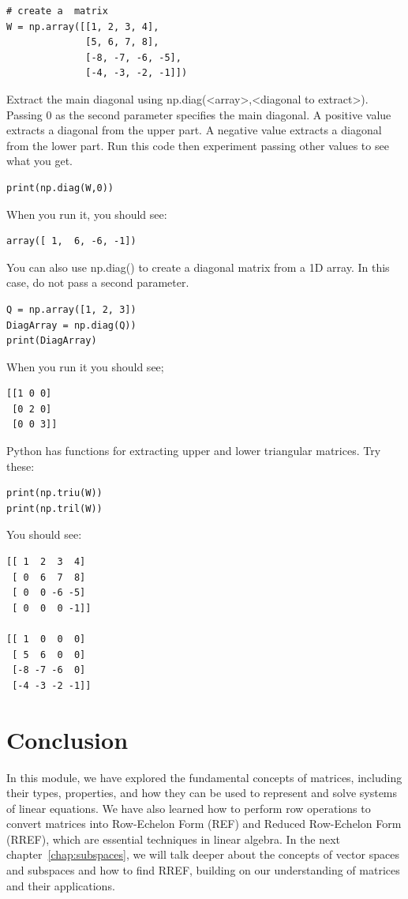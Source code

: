 \begin{verbatim}
# create a  matrix 
W = np.array([[1, 2, 3, 4], 
              [5, 6, 7, 8], 
              [-8, -7, -6, -5],
              [-4, -3, -2, -1]])
\end{verbatim}
Extract the main diagonal using np.diag(<array>,<diagonal to extract>). 
Passing 0 as the second parameter specifies the main diagonal. A positive value extracts a diagonal from the upper part. A negative value extracts a diagonal from the lower part. Run this code then experiment passing other values to see what you get.
\begin{verbatim}
print(np.diag(W,0))
\end{verbatim}
When you run it, you should see:
\begin{verbatim}
array([ 1,  6, -6, -1])
\end{verbatim}
You can also use np.diag() to create a diagonal matrix from a 1D array. In this case, do not pass a second parameter.
\begin{verbatim}
Q = np.array([1, 2, 3])
DiagArray = np.diag(Q))
print(DiagArray)
\end{verbatim}
When you run it you should see;
\begin{verbatim}
[[1 0 0]
 [0 2 0]
 [0 0 3]]
\end{verbatim}
Python has functions for extracting upper and lower triangular matrices. Try these:
\begin{verbatim}
print(np.triu(W))
print(np.tril(W))
\end{verbatim}
You should see:
\begin{verbatim}
[[ 1  2  3  4]
 [ 0  6  7  8]
 [ 0  0 -6 -5]
 [ 0  0  0 -1]]
 
[[ 1  0  0  0]
 [ 5  6  0  0]
 [-8 -7 -6  0]
 [-4 -3 -2 -1]]
\end{verbatim}

\section{Conclusion}
In this module, we have explored the fundamental concepts of matrices, including their types, properties, and how they can be used to represent and solve systems of linear equations. We have also learned how to perform row operations to convert matrices into Row-Echelon Form (REF) and Reduced Row-Echelon Form (RREF), which are essential techniques in linear algebra. In the next chapter~\ref{chap:subspaces}, we will talk deeper about the concepts of vector spaces and subspaces and how to find RREF, building on our understanding of matrices and their applications.
